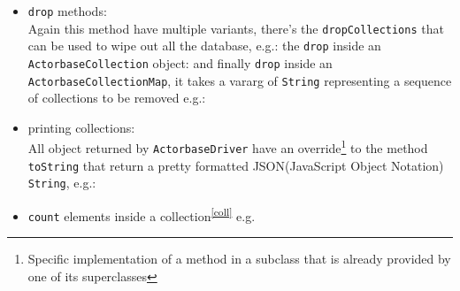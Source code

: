 \documentclass{scalatekids-article}
\begin{document}
\begin{itemize}
\item \verb=drop= methods:\\ Again this method have multiple variants, there's the
  \verb=dropCollections= that can be used to wipe out all the database, e.g.:
  the \verb=drop= inside an \verb=ActorbaseCollection= object:
  and finally \verb=drop= inside an \verb=ActorbaseCollectionMap=, it takes a
  vararg of \verb=String= representing a sequence of collections to be removed
  e.g.:
  \item printing collections:\\All object returned by \verb=ActorbaseDriver=
have an override\footnote{Specific implementation of a method in a subclass that
is already provided by one of its superclasses} to the method \verb=toString=
that return a pretty formatted JSON(JavaScript Object Notation) \verb=String=, e.g.:
\item \verb=count= elements inside a collection\textsuperscript{\ref{coll}} e.g.
\end{itemize}
\end{document}

